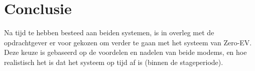 \section{Conclusie}

Na tijd te hebben besteed aan beiden systemen, is in overleg met de
opdrachtgever er voor gekozen om verder te gaan met het systeem van Zero-EV.
Deze keuze is gebaseerd op de voordelen en nadelen van beide modems, en hoe
realistisch het is dat het systeem op tijd af is (binnen de stageperiode).
